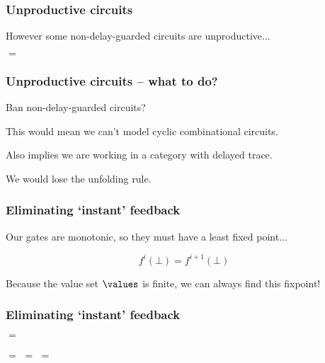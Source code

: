 \begin{frame}
    \frametitle{Unproductive circuits}

    However some non-delay-guarded circuits \alert{are} unproductive...

    \begin{center}
        \pause
        \pause
        \quad\(=\)\quad

    \end{center}

\end{frame}

\begin{frame}
    \frametitle{Unproductive circuits -- what to do?}

    Ban non-delay-guarded circuits?

    \pause

    This would mean we can't model cyclic combinational circuits.

    \pause

    Also implies we are working in a category with \alert{delayed trace}.
    
    \pause

    We would lose the \alert{unfolding} rule.

\end{frame}

\begin{frame}
    \frametitle{Eliminating `instant' feedback}

    \pause

    Our gates are \alert{monotonic}, so they must have a \alert{least fixed point}...
    
    \[f^i(\bot) = f^{i+1}(\bot)\]

    \pause

    Because the value set \(\values\) is finite, we can always find this fixpoint!    
    
\end{frame}

\begin{frame}
    \frametitle{Eliminating `instant' feedback}

    
    \begin{center}
        \pause
        \quad\(=\)\quad

        \vspace{1em}

        \pause
        \quad\(=\)\quad
        \pause
        \quad\(=\)\quad
        \pause
        \quad\(=\)\quad
    \end{center}


\end{frame}

